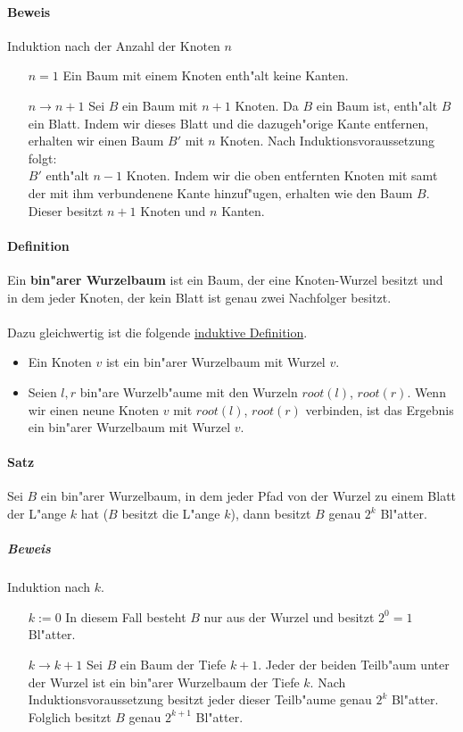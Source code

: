 \paragraph{Beweis} Induktion nach der Anzahl der Knoten $n$
\begin{itemize}
    \item[$n=1$] Ein Baum mit einem Knoten enth"alt keine Kanten.
    \item[$n\rightarrow n+1$] Sei $B$ ein Baum mit $n+1$ Knoten. Da $B$ ein Baum ist, enth"alt $B$ ein Blatt.
                              Indem wir dieses Blatt und die dazugeh"orige Kante entfernen, erhalten wir einen
                              Baum $B'$ mit $n$ Knoten. Nach Induktionsvoraussetzung folgt:\\
                              $B'$ enth"alt $n-1$ Knoten. Indem wir die oben entfernten Knoten mit samt der mit
                              ihm verbundenene Kante hinzuf"ugen, erhalten wie den Baum $B$. Dieser besitzt $n+1$
                              Knoten und $n$ Kanten.
\end{itemize}

\paragraph{Definition} \parskp
Ein \textbf{bin"arer Wurzelbaum} ist ein Baum, der eine Knoten-Wurzel besitzt und in dem jeder Knoten, der
kein Blatt ist genau zwei Nachfolger besitzt.\\
\\
Dazu gleichwertig ist die folgende \underline{induktive Definition}.
\begin{itemize}
    \item Ein Knoten $v$ ist ein bin"arer Wurzelbaum mit Wurzel $v$.
    \item Seien $l,r$ bin"are Wurzelb"aume mit den Wurzeln $root(l)$, $root(r)$. Wenn wir einen neune
          Knoten $v$ mit $root(l)$, $root(r)$ verbinden, ist das Ergebnis ein bin"arer Wurzelbaum mit
          Wurzel $v$.
\end{itemize}

\paragraph{Satz} \parskp
Sei $B$ ein bin"arer Wurzelbaum, in dem jeder Pfad von der Wurzel zu einem Blatt der L"ange $k$ hat
($B$ besitzt die L"ange $k$), dann besitzt $B$ genau $2^k$ Bl"atter.

\subparagraph{Beweis} Induktion nach $k$.
\begin{itemize}
    \item[$k:=0$] In diesem Fall besteht $B$ nur aus der Wurzel und besitzt $2^0=1$ Bl"atter.
    \item[$k\rightarrow k+1$] Sei $B$ ein Baum der Tiefe $k+1$. Jeder der beiden Teilb"aum unter der Wurzel
                            ist ein bin"arer Wurzelbaum der Tiefe $k$. Nach Induktionsvoraussetzung besitzt
                            jeder dieser Teilb"aume genau $2^k$ Bl"atter. Folglich besitzt $B$ genau
                            $2^{k+1}$ Bl"atter.
\end{itemize}

